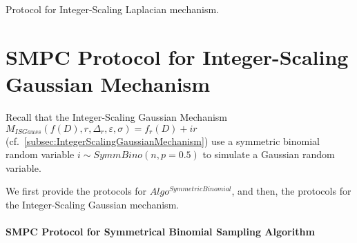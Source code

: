       \begin{protocol}[tbh!]
            \centering
            \caption{\smpc Protocol for Integer-Scaling Laplacian mechanism.}
            \label{prot:ISLap}
      \end{protocol}
      \FloatBarrier




      \section{SMPC Protocol for Integer-Scaling Gaussian Mechanism}
      \label{sec:MPCProtocolforInteger-ScalingGaussianMechanism}
      Recall that the Integer-Scaling Gaussian Mechanism $M_{ISGauss}\left(f\left(D\right),r,\Delta_r,\varepsilon,\sigma\right)=f_r\left(D\right) +ir$ (cf.~\autoref{subsec:IntegerScalingGaussianMechanism}) use a symmetric binomial random variable $i\sim SymmBino\left(n,p=0.5\right)$ to simulate a Gaussian random variable.

      We first provide the \smpc protocols for $Algo^{SymmetricBinomial}$, and then, the \smpc protocols for the Integer-Scaling Gaussian mechanism.

      \paragraph{SMPC Protocol for Symmetrical Binomial Sampling Algorithm}
      \label{para:MPCProtocolforSymmetricalBinomialSamplingAlgorithm}

